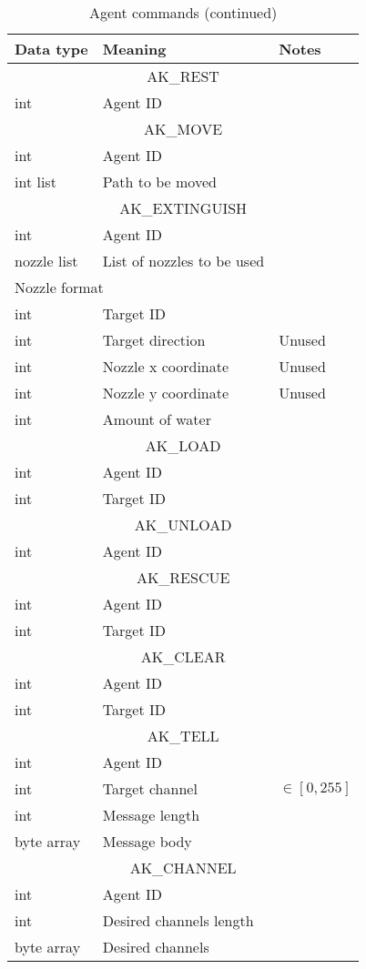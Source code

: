\begin{table}[p]
\center
\begin{tabular}{|lll|}
\hline
Data type & Meaning & Notes\\
\hline
\hline
\multicolumn{3}{|c|}{AK\_REST}\\
int & Agent ID & \\
\hline
\hline
\multicolumn{3}{|c|}{AK\_MOVE}\\
int & Agent ID & \\
int list & Path to be moved & \\
\hline
\hline
\multicolumn{3}{|c|}{AK\_EXTINGUISH}\\
int & Agent ID & \\
nozzle list & List of nozzles to be used & \\
\multicolumn{3}{|l|}{\hspace{5em}Nozzle format}\\
int & Target ID & \\
int & Target direction & Unused\\
int & Nozzle x coordinate & Unused\\
int & Nozzle y coordinate & Unused\\
int & Amount of water & \\
\hline
\hline
\multicolumn{3}{|c|}{AK\_LOAD}\\
int & Agent ID & \\
int & Target ID & \\
\hline
\hline
\multicolumn{3}{|c|}{AK\_UNLOAD}\\
int & Agent ID & \\
\hline
\hline
\multicolumn{3}{|c|}{AK\_RESCUE}\\
int & Agent ID & \\
int & Target ID & \\
\hline
\hline
\multicolumn{3}{|c|}{AK\_CLEAR}\\
int & Agent ID & \\
int & Target ID & \\
\hline
\hline
\multicolumn{3}{|c|}{AK\_TELL}\\
int & Agent ID & \\
int & Target channel &  $\in [0,255]$\\
int & Message length & \\
byte array & Message body & \\
\hline
\hline
\multicolumn{3}{|c|}{AK\_CHANNEL}\\
int & Agent ID & \\
int & Desired channels length & \\
byte array & Desired channels & \\
\hline
\end{tabular}
\caption{Agent commands (continued)}
\label{table_more_agent_commands}
\end{table}

